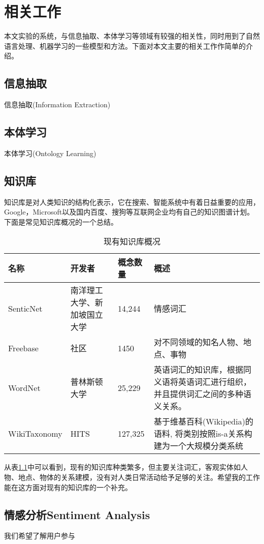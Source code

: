 \chapter{相关工作}
本文实验的系统，与信息抽取、本体学习等领域有较强的相关性，同时用到了自然语言处理、机器学习的一些模型和方法。下面对本文主要的相关工作作简单的介绍。
\section{信息抽取}
信息抽取(Information Extraction)
\section{本体学习}
本体学习(Ontology Learning)

\section{知识库}
知识库是对人类知识的结构化表示，它在搜索、智能系统中有着日益重要的应用，Google，Microsoft以及国内百度、搜狗等互联网企业均有自己的知识图谱计划。下面是常见知识库概况的一个总结。

\begin{table}[!h]
\begin{tabular}[0.7\textwidth]{|l|p{2cm}|l|p{4cm}|}
\hline
名称 & 开发者 & 概念数量  & 概述 \\
\hline
SenticNet & 南洋理工大学、新加坡国立大学 & 14,244	& 情感词汇  \\
\hline
Freebase & 社区	& 1450	& 对不同领域的知名人物、地点、事物 \\
\hline
WordNet\cite{miller1995wordnet} & 普林斯顿大学 & 25,229 & 英语词汇的知识库，根据同义语将英语词汇进行组织，并且提供词汇之间的多种语义关系。 \\
\hline
WikiTaxonomy\cite{ponzetto2007deriving}	& HITS & 127,325 & 基于维基百科(Wikipedia)的语料, 将类别按照is-a关系构建为一个大规模分类系统 \\
\hline
\end{tabular}
\caption{现有知识库概况}
\label{table:knowledge_base}
\end{table}

从表\ref{table:knowledge_base}中可以看到，现有的知识库种类繁多，但主要关注词汇，客观实体如人物、地点、物体的关系建模，没有对人类日常活动给予足够的关注。希望我的工作能在这方面对现有的知识库的一个补充。

\section{情感分析Sentiment Analysis}
我们希望了解用户参与
